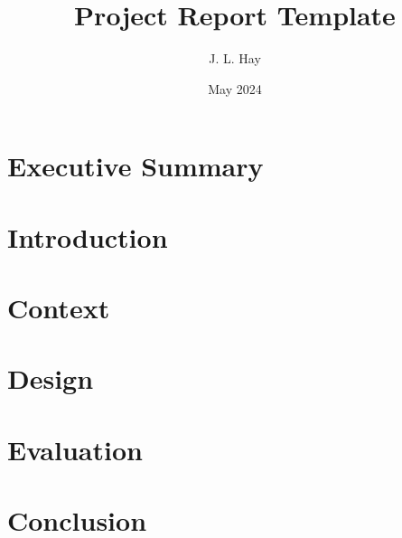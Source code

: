 \documentclass{article}
\title{Project Report Template}
\author{J. L. Hay \cite{hay22}}
\date{May 2024}
\begin{document}
\maketitle

\thispagestyle{empty}

\pagebreak



\section*{Executive Summary}


\pagebreak


\tableofcontents

\pagebreak


\fancyfoot[R]{\thepage/\pageref*{page:final}}

\section{Introduction}


\pagebreak


\section{Context}


\pagebreak


\section{Design}


\pagebreak


\section{Evaluation}


\pagebreak


\section*{Conclusion}
\label{page:final}


\pagebreak


\fancyfoot[R]{\thepage}

\printbibliography
{}

\pagebreak
\appendix


\end{document}
